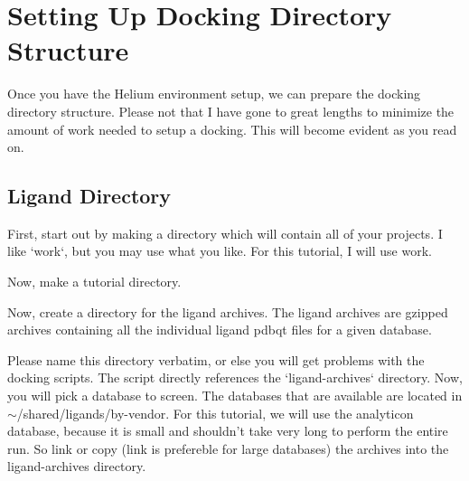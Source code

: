 \section{Setting Up Docking Directory Structure}

Once you have the Helium environment setup, we can prepare the docking directory structure. Please not that I have gone to great lengths to minimize the amount of work needed to setup a docking. This will become evident as you read on. \\

\subsection{Ligand Directory}
First, start out by making a directory which will contain all of your projects. I like `work`, but you may use what you like. For this tutorial, I will use work.

\begin{quote}
\end{quote}

Now, make a tutorial directory.

\begin{quote}
\end{quote}

Now, create a directory for the ligand archives. The ligand archives are gzipped archives containing all the individual ligand pdbqt files for a given database. 

\begin{quote}
\end{quote}

Please name this directory verbatim, or else you will get problems with the docking scripts. The script directly references the `ligand-archives` directory. Now, you will pick a database to screen. The databases that are available are located in $\sim$/shared/ligands/by-vendor. For this tutorial, we will use the analyticon database, because it is small and shouldn't take very long to perform the entire run. So link or copy (link is prefereble for large databases) the archives into the ligand-archives directory. 

\begin{quote}
\end{quote}

